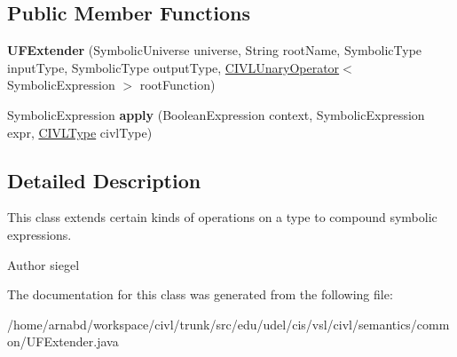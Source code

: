 \subsection*{Public Member Functions}
\begin{DoxyCompactItemize}
\item 
\hypertarget{classedu_1_1udel_1_1cis_1_1vsl_1_1civl_1_1semantics_1_1common_1_1UFExtender_aafb65a7065d1706d4c2156c78c3b7f95}{}{\bfseries U\+F\+Extender} (Symbolic\+Universe universe, String root\+Name, Symbolic\+Type input\+Type, Symbolic\+Type output\+Type, \hyperlink{interfaceedu_1_1udel_1_1cis_1_1vsl_1_1civl_1_1semantics_1_1common_1_1CIVLUnaryOperator}{C\+I\+V\+L\+Unary\+Operator}$<$ Symbolic\+Expression $>$ root\+Function)\label{classedu_1_1udel_1_1cis_1_1vsl_1_1civl_1_1semantics_1_1common_1_1UFExtender_aafb65a7065d1706d4c2156c78c3b7f95}

\item 
\hypertarget{classedu_1_1udel_1_1cis_1_1vsl_1_1civl_1_1semantics_1_1common_1_1UFExtender_aa80ce99c74bdc944b60b0bc4df6f805f}{}Symbolic\+Expression {\bfseries apply} (Boolean\+Expression context, Symbolic\+Expression expr, \hyperlink{interfaceedu_1_1udel_1_1cis_1_1vsl_1_1civl_1_1model_1_1IF_1_1type_1_1CIVLType}{C\+I\+V\+L\+Type} civl\+Type)\label{classedu_1_1udel_1_1cis_1_1vsl_1_1civl_1_1semantics_1_1common_1_1UFExtender_aa80ce99c74bdc944b60b0bc4df6f805f}

\end{DoxyCompactItemize}


\subsection{Detailed Description}
This class extends certain kinds of operations on a type to compound symbolic expressions. 

\begin{DoxyAuthor}{Author}
siegel 
\end{DoxyAuthor}


The documentation for this class was generated from the following file\+:\begin{DoxyCompactItemize}
\item 
/home/arnabd/workspace/civl/trunk/src/edu/udel/cis/vsl/civl/semantics/common/U\+F\+Extender.\+java\end{DoxyCompactItemize}
